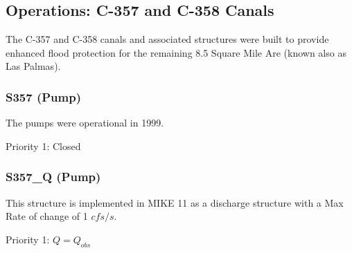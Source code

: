 

\clearpage
\subsection{Operations: C-357 and C-358 Canals}
The C-357 and C-358 canals and associated structures were built to provide enhanced flood protection for the remaining 8.5 Square Mile Are (known also as Las Palmas).

\subsubsection{S357  (Pump)}
The pumps were operational in 1999.

\begin{packed_items}
\item Priority 1: Closed
\end{packed_items}

\clearpage
\subsubsection{S357\_Q (Pump)}
This structure is implemented in MIKE 11 as a discharge structure with a Max Rate of change of 1 $cfs/s$.

\begin{packed_items}
\item Priority 1: $Q = Q_{obs}$
\end{packed_items}

